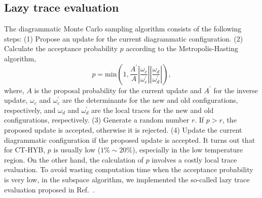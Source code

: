 \subsection{Lazy trace evaluation}
The diagrammatic Monte Carlo sampling algorithm consists of the following steps: (1) Propose an update for the current diagrammatic configuration. (2) Calculate the acceptance probability $p$ according to the Metropolis-Hasting algorithm,
\begin{equation}
p = \text{min} (1, \frac{A^\prime}{A} \left| \frac{\omega_{c}}{\omega_{c}^{\prime}}\right| 
     \left|\frac{\omega_{d}}{\omega_{d}^{\prime}} \right|),
\end{equation}
where, $A$ is the proposal probability for the current update and $A^\prime$ for the inverse update, $\omega_{c}$ and $\omega_{c}^{\prime}$ are the determinants for the new and old configurations, respectively, and $\omega_{d}$ and $\omega_{d}^{\prime}$ are the local traces for the new and old configurations, respectively. (3) Generate a random number $r$. If $p>r$, the proposed update is accepted, otherwise it is rejected. (4) Update the current diagrammatic configuration if the proposed update is accepted. It turns out that for CT-HYB, $p$ is usually low ($1\% \sim 20\%$), especially in the low temperature region. On the other hand, the calculation of $p$ involves a costly local trace evaluation. To avoid wasting computation time when the acceptance probability is very low, in the subspace algorithm, we implemented the so-called lazy trace evaluation proposed in Ref.~\cite{arXiv:1403.7214}.

